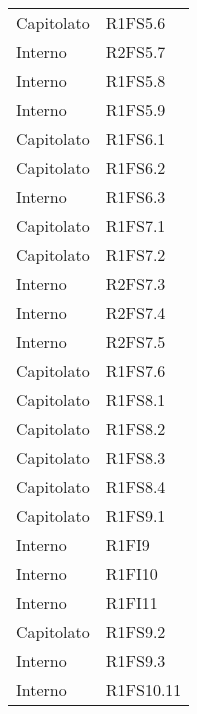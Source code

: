 {\begin{longtable}{ C{4cm} C{4cm}}

Capitolato & R1FS5.6\\

Interno & R2FS5.7\\

Interno & R1FS5.8\\

Interno & R1FS5.9\\

Capitolato & R1FS6.1\\

Capitolato & R1FS6.2\\

Interno & R1FS6.3\\

Capitolato & R1FS7.1\\

Capitolato & R1FS7.2\\

Interno & R2FS7.3\\

Interno & R2FS7.4\\

Interno & R2FS7.5\\

Capitolato & R1FS7.6\\

Capitolato & R1FS8.1\\


Capitolato & R1FS8.2\\

Capitolato & R1FS8.3\\

Capitolato & R1FS8.4\\

Capitolato & R1FS9.1\\

Interno & R1FI9\\

Interno & R1FI10\\

Interno & R1FI11\\

Capitolato & R1FS9.2\\


Interno & R1FS9.3\\

Interno & R1FS10.11\\


\end{longtable}}
